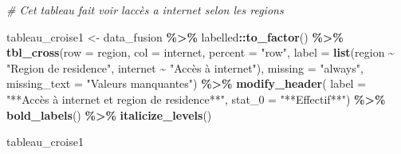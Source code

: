 \documentclass[
]{article}
\newenvironment{Shaded}{\begin{snugshade}}{\end{snugshade}}
\newcommand{\AttributeTok}[1]{\textcolor[rgb]{0.13,0.29,0.53}{#1}}
\newcommand{\CommentTok}[1]{\textcolor[rgb]{0.56,0.35,0.01}{\textit{#1}}}
\newcommand{\FunctionTok}[1]{\textcolor[rgb]{0.13,0.29,0.53}{\textbf{#1}}}
\newcommand{\NormalTok}[1]{#1}
\newcommand{\OtherTok}[1]{\textcolor[rgb]{0.56,0.35,0.01}{#1}}
\newcommand{\SpecialCharTok}[1]{\textcolor[rgb]{0.81,0.36,0.00}{\textbf{#1}}}
\newcommand{\StringTok}[1]{\textcolor[rgb]{0.31,0.60,0.02}{#1}}
\begin{document}
\begin{Shaded}
\begin{Highlighting}[]
\CommentTok{\# Cet tableau fait voir l\textquotesingle{}accès a internet selon les regions }

\NormalTok{tableau\_croise1 }\OtherTok{\textless{}{-}}\NormalTok{ data\_fusion }\SpecialCharTok{\%\textgreater{}\%}
\NormalTok{  labelled}\SpecialCharTok{::}\FunctionTok{to\_factor}\NormalTok{() }\SpecialCharTok{\%\textgreater{}\%}
  \FunctionTok{tbl\_cross}\NormalTok{(}\AttributeTok{row =}\NormalTok{ region,  }
    \AttributeTok{col =}\NormalTok{ internet, }
    \AttributeTok{percent =} \StringTok{"row"}\NormalTok{,  }
    \AttributeTok{label =} \FunctionTok{list}\NormalTok{(region }\SpecialCharTok{\textasciitilde{}} \StringTok{"Region de residence"}\NormalTok{,}
\NormalTok{    internet }\SpecialCharTok{\textasciitilde{}} \StringTok{"Accès à internet"}\NormalTok{),}
    \AttributeTok{missing =} \StringTok{"always"}\NormalTok{,}
    \AttributeTok{missing\_text =} \StringTok{"Valeurs manquantes"}\NormalTok{) }\SpecialCharTok{\%\textgreater{}\%}
  \FunctionTok{modify\_header}\NormalTok{(}
    \AttributeTok{label =} \StringTok{"**Accès à internet et region de residence**"}\NormalTok{,}
    \AttributeTok{stat\_0 =} \StringTok{"**Effectif**"}\NormalTok{) }\SpecialCharTok{\%\textgreater{}\%}
  \FunctionTok{bold\_labels}\NormalTok{() }\SpecialCharTok{\%\textgreater{}\%}  
  \FunctionTok{italicize\_levels}\NormalTok{()}

\NormalTok{tableau\_croise1}
\end{Highlighting}
\end{Shaded}
\end{document}
